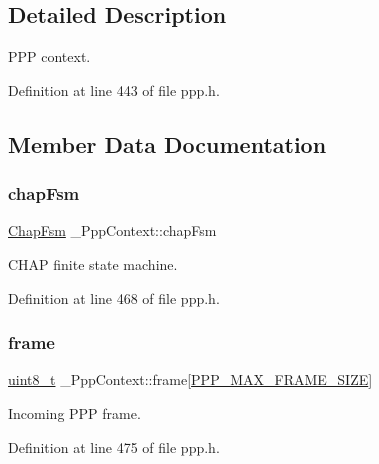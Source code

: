 \subsection{Detailed Description}
P\+PP context. 

Definition at line 443 of file ppp.\+h.



\subsection{Member Data Documentation}
\mbox{\label{struct__PppContext_a0beb2443b619ed307ed3c3f8ca634156}} 
\subsubsection{\texorpdfstring{chap\+Fsm}{chapFsm}}
{\footnotesize\ttfamily \hyperlink{structChapFsm}{Chap\+Fsm} \+\_\+\+Ppp\+Context\+::chap\+Fsm}



C\+H\+AP finite state machine. 



Definition at line 468 of file ppp.\+h.

\mbox{\label{struct__PppContext_a1cf0d11471c0ecf43ad3a15a9bf48ddd}} 
\subsubsection{\texorpdfstring{frame}{frame}}
{\footnotesize\ttfamily \hyperlink{stdint_8h_aba7bc1797add20fe3efdf37ced1182c5}{uint8\+\_\+t} \+\_\+\+Ppp\+Context\+::frame\mbox{[}\hyperlink{ppp_8h_a54f0a20e93fc9a0666001e044bbbcc15}{P\+P\+P\+\_\+\+M\+A\+X\+\_\+\+F\+R\+A\+M\+E\+\_\+\+S\+I\+ZE}\mbox{]}}



Incoming P\+PP frame. 



Definition at line 475 of file ppp.\+h.

\mbox{\label{struct__PppContext_abeb1acef5b87805d20505a3e08225233}} 
